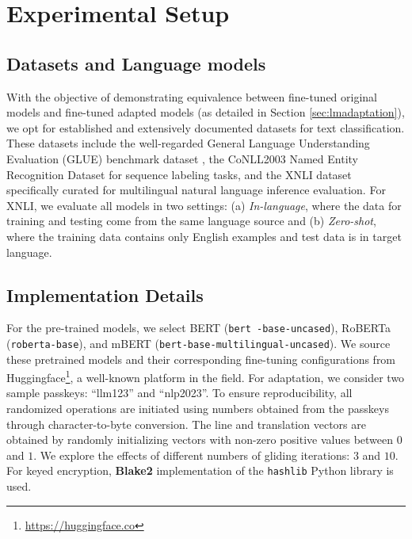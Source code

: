 \documentclass[letterpaper]{article} %
\begin{document}
\section{Experimental Setup}
\label{sec:expsetup}

\subsection{Datasets and Language models}
With the objective of demonstrating equivalence between fine-tuned original models and fine-tuned adapted models (as detailed in Section \ref{sec:lmadaptation}), we opt for established and extensively documented datasets for text classification. These datasets include the well-regarded General Language Understanding Evaluation (GLUE) benchmark dataset \cite{wang2018glue}, the CoNLL2003 Named Entity Recognition Dataset \cite{sang2003introduction} for sequence labeling tasks, and the XNLI dataset \cite{conneau2018xnli} specifically curated for multilingual natural language inference evaluation. For XNLI, we evaluate all models in two settings: (a) \textit{In-language}, where the data for training and testing come from the same language source and (b) \textit{Zero-shot}, where the training data contains only English examples and test data is in target language. 
\subsection{Implementation Details}
For the pre-trained models, we select BERT (\texttt{bert -base-uncased}), RoBERTa (\texttt{roberta-base}), and mBERT (\texttt{bert-base-multilingual-uncased}). We source these pretrained models and their corresponding fine-tuning configurations from Huggingface\footnote{\url{https://huggingface.co}}, a well-known platform in the field. For adaptation, we consider two sample passkeys: ``llm123'' and ``nlp2023''. To ensure reproducibility, all randomized operations are initiated using numbers obtained from the passkeys through character-to-byte conversion. The line and translation vectors are obtained by randomly initializing vectors with non-zero positive values between $0$ and $1$. We explore the effects of different numbers of gliding iterations: $3$ and $10$. For keyed encryption, \textbf{Blake2} implementation of the \texttt{hashlib} Python library is used. 
\end{document}
